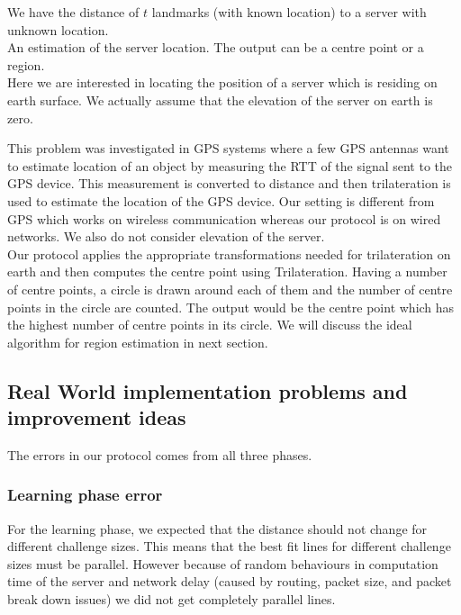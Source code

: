 \documentclass[12pt]{article}
\begin{document}
 We have the distance of $t$ landmarks (with known location) to a server 
with unknown location.\\
 An estimation of the server location. The output can be a centre point or 
a region. \\

Here we are interested in locating the position 
of a server which is residing on earth surface. We actually assume that the elevation 
of the server on earth is zero. 

This problem was investigated in GPS systems where a few GPS antennas want to estimate location 
of an object by measuring the RTT of the signal sent to the GPS device. This measurement 
is converted to distance and then trilateration is used to estimate the location of the GPS device.
Our setting is different from GPS which works on wireless communication whereas our protocol 
is on wired networks. We also do not consider elevation of the server. \\

Our protocol applies the appropriate transformations needed for trilateration on
earth and then computes the centre point using Trilateration. Having a number
of centre points, a circle is drawn around each of them and the number
of centre points in the circle are counted. The output would be the
centre point which has the highest number of centre points in its
circle. We will discuss the ideal algorithm for region estimation in next section. 


\subsection{Real World implementation problems and improvement ideas}
The errors in our protocol comes from all three phases. \\

\subsubsection{Learning phase error} 
For the learning phase, we expected that the distance should not change for 
different challenge sizes. This means that the best fit lines for different 
challenge sizes must be parallel. However because of random behaviours in 
computation time of the server and network delay (caused by routing, packet size, 
and packet break down issues) we did not get completely parallel lines. 
\end{document}
